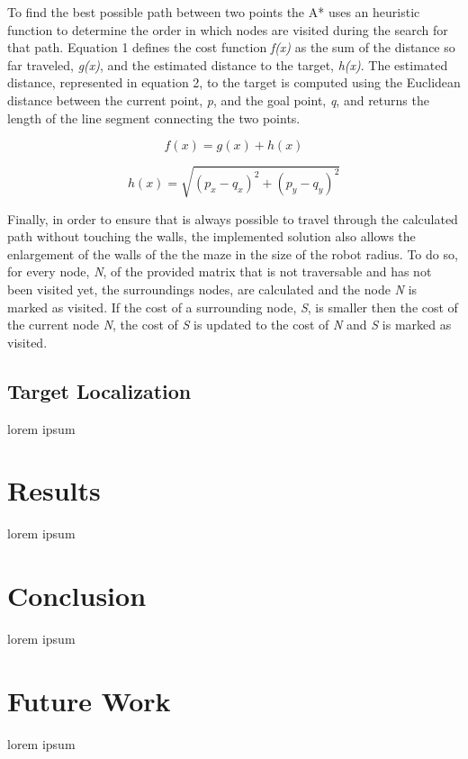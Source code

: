 \documentclass[oribibl]{llncs}
\begin{document}
To find the best possible path between two points the A* uses an heuristic function to determine the order in which nodes are visited during the search for that path. Equation 1 defines the cost function \textit{f(x)} as the sum of the distance so far traveled, \textit{g(x)}, and the estimated distance to the target, \textit{h(x)}. The estimated distance, represented in equation 2,  to the target is computed using the Euclidean distance between the current point, \textit{p}, and the goal point, \textit{q}, and returns the length of the line segment connecting the two points.

\begin{equation}
f(x) = g(x) + h(x)
\end{equation}

\begin{equation}
h(x) = \sqrt{(p_x - q_x)^2 + (p_y - q_y)^2}
\end{equation}

Finally, in order to ensure that is always possible to travel through the calculated path without touching the walls, the implemented solution also allows the enlargement of the walls of the the maze in the size of the robot radius. To do so, for every node, \textit{N}, of the provided matrix that is not traversable and has not been visited yet, the surroundings nodes, are calculated and the node \textit{N} is marked as visited. If the cost of a surrounding node, \textit{S}, is smaller then the cost of the current node \textit{N}, the cost of \textit{S} is updated to the cost of \textit{N} and \textit{S} is marked as visited.





\subsection{Target Localization}
lorem ipsum

\section{Results}
lorem ipsum

\section{Conclusion}
lorem ipsum

\section{Future Work}
lorem ipsum


\end{document}
